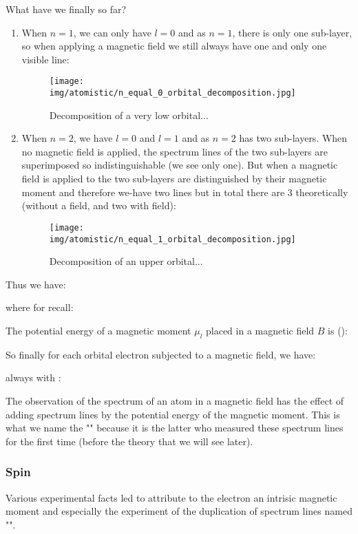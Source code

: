      What have we finally so far?
     \begin{enumerate}
         \item When $n=1$, we can only have $l=0$ and as $n=1$, there is only one sub-layer, so when applying a magnetic field we still always have one and only one visible line:
         \begin{figure}[H]
			\centering
			\texttt{[image: img/atomistic/n\_equal\_0\_orbital\_decomposition.jpg]}
			\caption{Decomposition of a very low orbital...}
		\end{figure}
			
		\item When $n=2$, we have $l=0$ and $l=1$ and as $n=2$ has two sub-layers. When no magnetic field is applied, the spectrum lines of the two sub-layers are superimposed so indistinguishable (we see only one). But when a magnetic field is applied to the two sub-layers are distinguished by their magnetic moment and therefore we-have two lines but in total there are 3 theoretically (without a field, and two with field):
		\begin{figure}[H]
			\centering
			\texttt{[image: img/atomistic/n\_equal\_1\_orbital\_decomposition.jpg]}
			\caption{Decomposition of an upper orbital...}
		\end{figure}
     \end{enumerate}
	Thus we have:
    
    where for recall\label{quantum number of orbital angular momentum interval}:
     
    The potential energy of a magnetic moment $\mu_l$ placed in a magnetic field $B$ is ():
       
    So finally for each orbital electron subjected to a magnetic field, we have:
    
     always with :
     
     The observation of the spectrum of an atom in a magnetic field has the effect of adding spectrum lines by the potential energy of the magnetic moment. This is what we name the "" because it is the latter who measured these spectrum lines for the first time (before the theory that we will see later).
     
     \subsubsection{Spin}\label{spin}
     Various experimental facts led to attribute to the electron an intrisic magnetic moment and especially the experiment of the duplication of spectrum lines named "".

